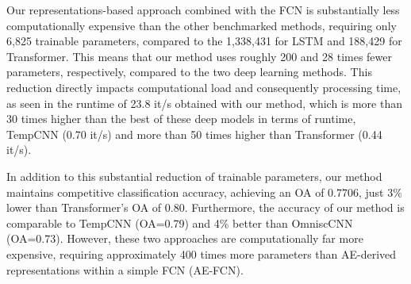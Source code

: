 \documentclass[journal,article,submit,pdftex,moreauthors]{Definitions/mdpi}
\begin{document}


Our representations-based approach combined with the FCN is substantially less computationally expensive than the other benchmarked methods, requiring only 6,825 trainable parameters, compared to the 1,338,431 for LSTM and 188,429 for Transformer. This means that our method uses roughly 200 and 28 times fewer parameters, respectively, compared to the two deep learning methods. This reduction directly impacts computational load and consequently processing time, as seen in the runtime of 23.8 it/s obtained with our method, which is more than 30 times higher than the best of these deep models in terms of runtime, TempCNN (0.70 it/s) and more than 50 times higher than Transformer (0.44 it/s).

In addition to this substantial reduction of trainable parameters, our method maintains competitive classification accuracy, achieving an OA of 0.7706, just $3\%$ lower than Transformer's OA of 0.80. Furthermore, the accuracy of our method is comparable to TempCNN (OA=0.79) and 4\% better than OmniscCNN (OA=0.73). However, these two approaches are computationally far more expensive, requiring approximately 400 times more parameters than AE-derived representations within a simple FCN (AE-FCN).
\end{document}
